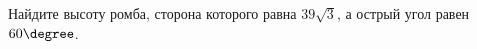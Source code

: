 \begin{ex}
	\begin{condition}
		Найдите высоту ромба, сторона которого равна \( 39\sqrt{3} \), а острый угол равен \( 60 \degree \).
	\end{condition}
\end{ex}